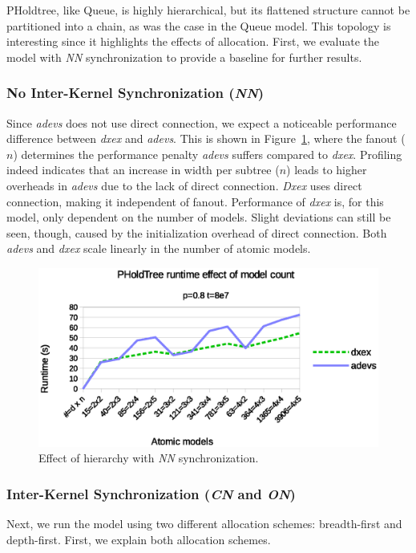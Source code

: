 PHoldtree, like Queue, is highly hierarchical, but its flattened structure cannot be partitioned into a chain, as was the case in the Queue model.
This topology is interesting since it highlights the effects of allocation.
First, we evaluate the model with \textit{NN} synchronization to provide a baseline for further results.

\subsubsection{No Inter-Kernel Synchronization (\textit{NN})}
Since \textit{adevs} does not use direct connection, we expect a noticeable performance difference between \textit{dxex} and \textit{adevs}.
This is shown in Figure~\ref{fig:PHOLDtree_seq_dn_benchmark}, where the fanout ($n$) determines the performance penalty \textit{adevs} suffers compared to \textit{dxex}.
Profiling indeed indicates that an increase in width per subtree ($n$) leads to higher overheads in \textit{adevs} due to the lack of direct connection.
\textit{Dxex} uses direct connection, making it independent of fanout.
Performance of \textit{dxex} is, for this model, only dependent on the number of models.
Slight deviations can still be seen, though, caused by the initialization overhead of direct connection.
Both \textit{adevs} and \textit{dxex} scale linearly in the number of atomic models.

\begin{figure}
    \center
    \includegraphics[width=\columnwidth]{fig/pholdtree_sequential_dn.eps}
    \caption{Effect of hierarchy with \textit{NN} synchronization.}
    \label{fig:PHOLDtree_seq_dn_benchmark}
\end{figure}

\subsubsection{Inter-Kernel Synchronization (\textit{CN} and \textit{ON})}
Next, we run the model using two different allocation schemes: breadth-first and depth-first.
First, we explain both allocation schemes.


